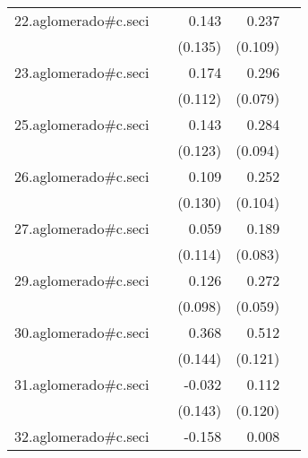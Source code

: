 {\begin{longtable}{l*{4}{D{.}{.}{-1}}}
\addlinespace
22.aglomerado#c.seci&                     &       0.143         &       0.237\sym{*}  &                     \\
            &                     &     (0.135)         &     (0.109)         &                     \\
\addlinespace
23.aglomerado#c.seci&                     &       0.174         &       0.296\sym{***}&                     \\
            &                     &     (0.112)         &     (0.079)         &                     \\
\addlinespace
25.aglomerado#c.seci&                     &       0.143         &       0.284\sym{**} &                     \\
            &                     &     (0.123)         &     (0.094)         &                     \\
\addlinespace
26.aglomerado#c.seci&                     &       0.109         &       0.252\sym{*}  &                     \\
            &                     &     (0.130)         &     (0.104)         &                     \\
\addlinespace
27.aglomerado#c.seci&                     &       0.059         &       0.189\sym{*}  &                     \\
            &                     &     (0.114)         &     (0.083)         &                     \\
\addlinespace
29.aglomerado#c.seci&                     &       0.126         &       0.272\sym{***}&                     \\
            &                     &     (0.098)         &     (0.059)         &                     \\
\addlinespace
30.aglomerado#c.seci&                     &       0.368\sym{*}  &       0.512\sym{***}&                     \\
            &                     &     (0.144)         &     (0.121)         &                     \\
\addlinespace
31.aglomerado#c.seci&                     &      -0.032         &       0.112         &                     \\
            &                     &     (0.143)         &     (0.120)         &                     \\
\addlinespace
32.aglomerado#c.seci&                     &      -0.158         &       0.008         &                     \\

\end{longtable}}
